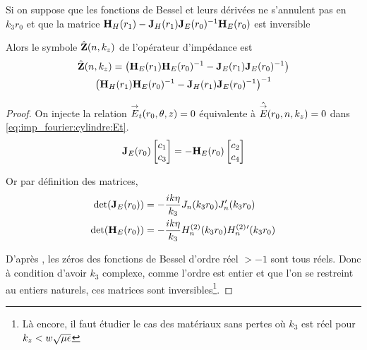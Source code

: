     \begin{thm}
      Si on suppose que les fonctions de Bessel et leurs dérivées ne s’annulent pas en \(k_3r_0\) et que
      la matrice \(\mathbf{H}_{H}(r_1) - \mathbf{J}_{H}(r_1)\mathbf{J}_{E}(r_0)^{-1}\mathbf{H}_{E}(r_0)\) est inversible

      Alors le symbole \(\hat {\mathbf{Z}}(n,k_z)\) de l'opérateur d'impédance est
      \begin{multline}
        \hat {\mathbf{Z}}(n,k_z) =
        \left(\mathbf{H}_{E}(r_1)\mathbf{H}_{E}(r_0)^{-1} - \mathbf{J}_{E}(r_1)\mathbf{J}_{E}(r_0)^{-1}\right)\\
        \left(\mathbf{H}_{H}(r_1)\mathbf{H}_{E}(r_0)^{-1} - \mathbf{J}_{H}(r_1)\mathbf{J}_{E}(r_0)^{-1}\right)^{-1}
      \end{multline}
    \end{thm}

    \begin{proof}

      On injecte la relation \({\overset{\rightarrow}{E}}_t(r_0,\theta,z) = 0\) équivalente à \(\hat {{\overset{\rightarrow}{E}}}(r_0,n,k_z) = 0\) dans \eqref{eq:imp_fourier:cylindre:Et}.
      \begin{equation}
        \mathbf{J}_{E}(r_0)
        \begin{bmatrix}
          c_1 \\
          c_3
        \end{bmatrix}
        =-\mathbf{H}_{E}(r_0)
        \begin{bmatrix}
          c_2 \\
          c_4
        \end{bmatrix}
      \end{equation}

      Or par définition des matrices,
      \begin{align}
        \det(\mathbf{J}_E(r_0)) &= -\dfrac{ik\eta}{k_3}J_n(k_3r_0)J_n'(k_3r_0)
        \\
        \det(\mathbf{H}_E(r_0)) &= -\dfrac{ik\eta}{k_3}H_n^{(2)}(k_3r_0)H_n^{(2)}{}'(k_3r_0)
      \end{align}

      D’après \cite[p.~370]{abramowitz_handbook_1964}, les zéros des fonctions de Bessel d'ordre réel \(>-1\) sont tous réels.
      Donc à condition d'avoir \(k_3\) complexe, comme l'ordre est entier et que l'on se restreint au entiers naturels, ces matrices sont inversibles\footnote{Là encore, il faut étudier le cas des matériaux sans pertes où \(k_3\) est réel pour \(k_z < w\sqrt{\mu\epsilon}\)}.


\end{proof}
